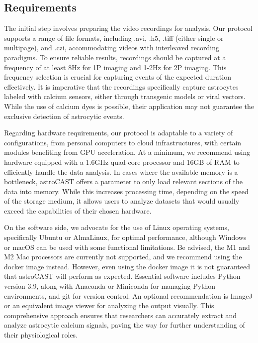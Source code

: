 \subsection{Requirements}
The initial step involves preparing the video recordings for analysis. Our protocol supports a range of file formats, including .avi, .h5, .tiff (either single or multipage), and .czi, accommodating videos with interleaved recording paradigms. To ensure reliable results, recordings should be captured at a frequency of at least 8Hz for \ac{1P} imaging and 1-2Hz for \ac{2P} imaging. This frequency selection is crucial for capturing events of the expected duration effectively. It is imperative that the recordings specifically capture astrocytes labeled with calcium sensors, either through transgenic models or viral vectors. While the use of calcium dyes is possible, their application may not guarantee the exclusive detection of astrocytic events.

Regarding hardware requirements, our protocol is adaptable to a variety of configurations, from personal computers to cloud infrastructures, with certain modules benefiting from GPU acceleration. At a minimum, we recommend using hardware equipped with a 1.6GHz quad-core processor and 16GB of RAM to efficiently handle the data analysis. In cases where the available memory is a bottleneck, astroCAST offers a  parameter to only load relevant sections of the data into memory. While this increases processing time, depending on the speed of the storage medium, it allows users to analyze datasets that would usually exceed the capabilities of their chosen hardware.

On the software side, we advocate for the use of Linux operating systems, specifically Ubuntu or AlmaLinux, for optimal performance, although Windows or macOS can be used with some functional limitations. Be advised, the M1 and M2 Mac processors are currently not supported, and we recommend using the docker image instead. However, even using the docker image it is not guaranteed that astroCAST will perform as expected. Essential software includes Python version 3.9, along with Anaconda or Miniconda for managing Python environments, and git for version control. An optional recommendation is ImageJ or an equivalent image viewer for analyzing the output visually. This comprehensive approach ensures that researchers can accurately extract and analyze astrocytic calcium signals, paving the way for further understanding of their physiological roles.

